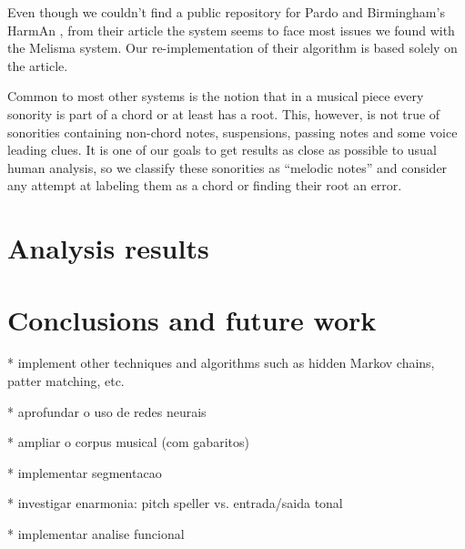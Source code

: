 \documentclass{article}
\begin{document}
Even though we couldn't find a public repository for Pardo and
Birmingham's HarmAn \cite{pardo99:automated}, from their article the
system seems to face most issues we found with the Melisma system. Our
re-implementation of their algorithm is based solely on the article.

Common to most other systems is the notion that in a musical piece
every sonority is part of a chord or at least has a root. This,
however, is not true of sonorities containing non-chord notes,
suspensions, passing notes and some voice leading clues. It is one of
our goals to get results as close as possible to usual human analysis,
so we classify these sonorities as ``melodic notes'' and consider any
attempt at labeling them as a chord or finding their root an error.
 
\section{Analysis results}
\label{sec:analysis-results}

\section{Conclusions and future work}
\label{sec:concl-future-work}


* implement other techniques and algorithms such as hidden Markov
chains, patter matching, etc.

* aprofundar o uso de redes neurais

* ampliar o corpus musical (com gabaritos)

* implementar segmentacao

* investigar enarmonia: pitch speller vs. entrada/saida tonal

* implementar analise funcional



\end{document}
